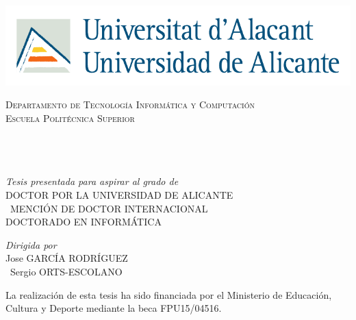 \begin{titlepage}
\begin{center}
	
\includegraphics[width=0.64\linewidth]{figures/logoua}

\vfill

\textsc{\LARGE Departamento de Tecnología Informática y Computación}\\[1.5cm] %
\textsc{\Large Escuela Politécnica Superior}\\[0.5cm] %

{\huge \bfseries \ttitle}\\[0.4cm] %
 
\begin{center} \large
{\authorname} %
\\\ \\
\emph{Tesis presentada para aspirar al grado de} \\
{DOCTOR POR LA UNIVERSIDAD DE ALICANTE}\\\
{MENCIÓN DE DOCTOR INTERNACIONAL}\\
{DOCTORADO EN INFORMÁTICA}\\
\end{center}

\vfill
 
\large \textit{Dirigida por}\\[0.3cm] %
{Jose GARCÍA RODRÍGUEZ}\\\
{Sergio ORTS-ESCOLANO}\\
 
 \vfill
 
{\large La realización de esta tesis ha sido financiada por el Ministerio de Educación, Cultura y Deporte mediante la beca FPU15/04516.}\\[4cm] %
 
\end{center}
\end{titlepage}
